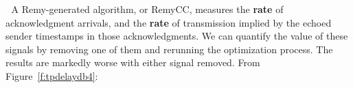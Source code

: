 \vspace{\baselineskip}
\enlargethispage{\baselineskip}

\noindent \begin{minipage}{\textwidth}

\textcolor{white}{.}\hspace{\parindent} A Remy-generated algorithm, or
RemyCC, measures the \textbf{rate} of acknowledgment arrivals, and the
\textbf{rate} of transmission implied by the echoed sender timestamps
in those acknowledgments. We can quantify the value of these signals
by removing one of them and rerunning the optimization process. The
results are markedly worse with either signal removed.  From
Figure~\ref{f:tpdelaydb4}:

\begin{center}
\def\svgwidth{0.8 \textwidth}\footnotesize
\end{center}
\end{minipage}


